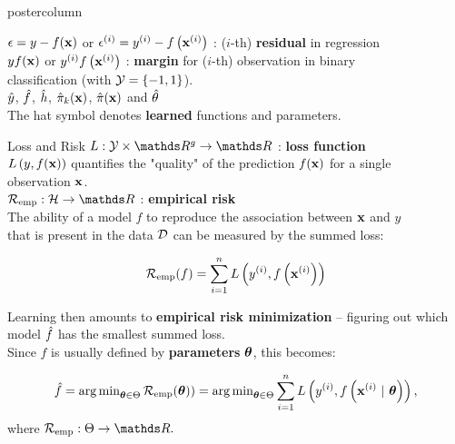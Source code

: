 \documentclass{beamer}
\begin{document}
\begin{frame}[fragile]{}
\begin{columns}
\begin{column}{.31\textwidth}
\begin{beamercolorbox}[center]{postercolumn}
\begin{minipage}{.98\textwidth}
{\begin{myblock}{}

$\epsilon = y - f(\mathbf{x})$ or $\epsilon^{(i)} = y^{(i)} - f\left(\mathbf{x}^{(i)}\right)$ : ($i$-th) \textbf{residual} in regression\\

$y f(\mathbf{x})$ or $y^{(i)} f\left(\mathbf{x}^{(i)}\right)$ : \textbf{margin} for ($i$-th) observation in binary \\ classification (with $\mathcal{Y} = \{-1, 1\}$). \\

$\hat{y}$, $\hat{f}$, $\hat{h}$, $\hat \pi_{k}(\mathbf{x})$, $\hat \pi(\mathbf{x})$ and $\hat{\theta}$ \\
The hat symbol denotes \textbf{learned} functions and parameters.
\end{myblock}
\begin{myblock}{Loss and Risk}
  $L: \Yspace \times \R^g \to \R$ : \textbf{loss function} \\
 $L\left(y, f(\mathbf{x})\right)$ quantifies the "quality" of the prediction $f(\mathbf{x})$ for a single \\
 observation $\mathbf{x}$.  \\
  
  $\riske:  \Hspace \to \R $ : \textbf{empirical risk } \\
The ability of a model $f$ to reproduce the association between $\mathbf{x}$ and $y$ \\
that is present in the data $\mathcal{D}$ can be measured by the summed loss:
  
  $$\mathcal{R}_{\text{emp}}(f) = \sum\limits_{i=1}^n L\left(y^{(i)}, f\left(\mathbf{x}^{(i)}\right)\right)$$ 
  
Learning then amounts to \textbf{empirical risk minimization} -- figuring out which model $\hat{f}$ has the smallest summed loss. \\ 
Since $f$ is usually defined by \textbf{parameters} $\bm{\theta}$, this becomes:

$$\hat{f} = \operatorname{arg\,min}_{\bm{\theta} \in \Theta} \mathcal{R}_{\text{emp}}(\bm{\theta})) = \operatorname{arg\,min}_{\bm{\theta} \in \Theta} \sum\limits_{i=1}^n L\left(y^{(i)}, f\left(\mathbf{x}^{(i)} ~|~ \bm{\theta}\right)\right),$$
where $\riske : \Theta \to \R.$


\end{myblock}}
\end{minipage}
\end{beamercolorbox}
\end{column}
\end{columns}
\end{frame}
\end{document}
